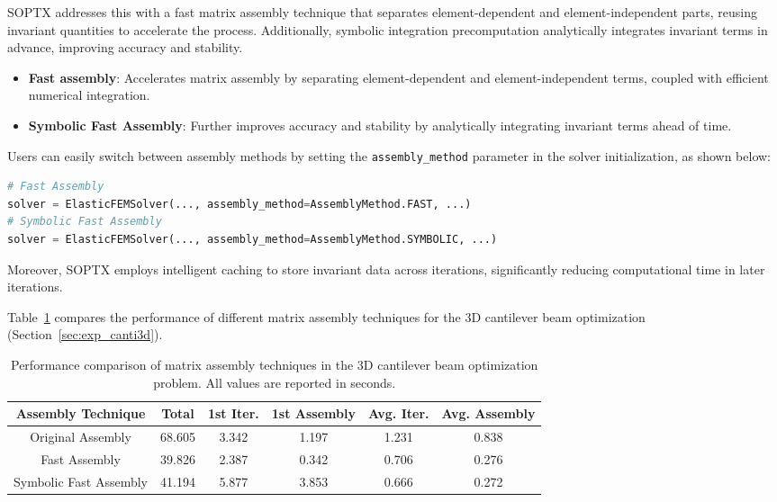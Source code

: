 \documentclass[mathpazo]{cicp}
\begin{document}
SOPTX addresses this with a fast matrix assembly technique that separates element-dependent and element-independent parts, reusing invariant quantities to accelerate the process. Additionally, symbolic integration precomputation analytically integrates invariant terms in advance, improving accuracy and stability.
\vspace{-0.5ex} %
\begin{itemize} 
	\item \textbf{Fast assembly}: Accelerates matrix assembly by separating element-dependent and element-independent terms, coupled with efficient numerical integration.
	\item \textbf{Symbolic Fast Assembly}: Further improves accuracy and stability by analytically integrating invariant terms ahead of time.
\end{itemize}
\vspace{-0.5ex} %

Users can easily switch between assembly methods by setting the \texttt{assembly\_method} parameter in the solver initialization, as shown below:
\vspace{-0.5ex} %
\begin{lstlisting}[language=python]
# Fast Assembly
solver = ElasticFEMSolver(..., assembly_method=AssemblyMethod.FAST, ...)
# Symbolic Fast Assembly
solver = ElasticFEMSolver(..., assembly_method=AssemblyMethod.SYMBOLIC, ...)
\end{lstlisting}
\vspace{-0.5ex} %

Moreover, SOPTX employs intelligent caching to store invariant data across iterations, significantly reducing computational time in later iterations.

Table~\ref{tab:assembly_comparison} compares the performance of different matrix assembly techniques for the 3D cantilever beam optimization (Section~\ref{sec:exp_canti3d}).

\vspace{-0.5ex} %
\begin{table}[htbp]
	\centering
	\caption{Performance comparison of matrix assembly techniques in the 3D cantilever beam optimization problem. All values are reported in seconds.}
	\begin{tabular}{cccccc}
		\toprule
		\textbf{Assembly Technique} & \textbf{Total} & \textbf{1st Iter.} & \textbf{1st Assembly} & \textbf{Avg. Iter.} & \textbf{Avg. Assembly} \\
		\midrule
		Original Assembly & 68.605 & 3.342 & 1.197 & 1.231 & 0.838 \\
		Fast Assembly & 39.826 & 2.387 & 0.342 & 0.706 & 0.276 \\
		Symbolic Fast Assembly & 41.194 & 5.877 & 3.853 & 0.666 & 0.272 \\
		\bottomrule
	\end{tabular}
	\label{tab:assembly_comparison}
\end{table}
\vspace{-0.5ex} %
\end{document}
